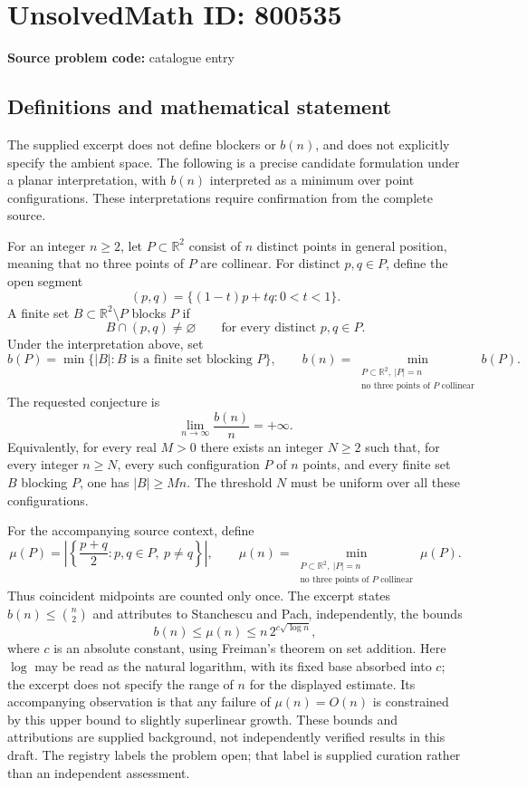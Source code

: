 \documentclass[11pt]{article}
\newcommand{\R}{\mathbb{R}}
\begin{document}
\section*{UnsolvedMath ID: 800535}
\textbf{Source problem code:} catalogue entry
\subsection{Definitions and mathematical statement}
The supplied excerpt does not define blockers or $b(n)$, and does not explicitly specify the ambient space. The following is a precise candidate formulation under a planar interpretation, with $b(n)$ interpreted as a minimum over point configurations. These interpretations require confirmation from the complete source.

For an integer $n\geq 2$, let $P\subset\R^2$ consist of $n$ distinct points in general position, meaning that no three points of $P$ are collinear. For distinct $p,q\in P$, define the open segment
\[
(p,q)=\{(1-t)p+tq:0<t<1\}.
\]
A finite set $B\subset\R^2\setminus P$ blocks $P$ if
\[
B\cap(p,q)\neq\varnothing
\qquad\text{for every distinct }p,q\in P.
\]
Under the interpretation above, set
\[
b(P)=\min\{|B|:B\text{ is a finite set blocking }P\},
\qquad
b(n)=\min_{\substack{P\subset\R^2,\ |P|=n\\\text{no three points of }P\text{ collinear}}}b(P).
\]
The requested conjecture is
\[
\lim_{n\to\infty}\frac{b(n)}{n}=+\infty.
\]
Equivalently, for every real $M>0$ there exists an integer $N\geq2$ such that, for every integer $n\geq N$, every such configuration $P$ of $n$ points, and every finite set $B$ blocking $P$, one has $|B|\geq Mn$. The threshold $N$ must be uniform over all these configurations.

For the accompanying source context, define
\[
\mu(P)=\left|\left\{\frac{p+q}{2}:p,q\in P,\ p\neq q\right\}\right|,
\qquad
\mu(n)=\min_{\substack{P\subset\R^2,\ |P|=n\\\text{no three points of }P\text{ collinear}}}\mu(P).
\]
Thus coincident midpoints are counted only once. The excerpt states $b(n)\leq\binom n2$ and attributes to Stanchescu and Pach, independently, the bounds
\[
b(n)\leq\mu(n)\leq n\,2^{c\sqrt{\log n}},
\]
where $c$ is an absolute constant, using Freiman's theorem on set addition. Here $\log$ may be read as the natural logarithm, with its fixed base absorbed into $c$; the excerpt does not specify the range of $n$ for the displayed estimate. Its accompanying observation is that any failure of $\mu(n)=O(n)$ is constrained by this upper bound to slightly superlinear growth. These bounds and attributions are supplied background, not independently verified results in this draft. The registry labels the problem open; that label is supplied curation rather than an independent assessment.
\end{document}
